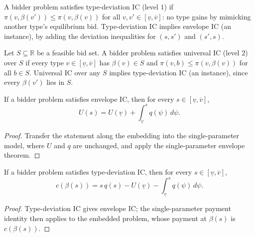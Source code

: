 \begin{definition}\label{def:MathEconLib.BidderProblem.HasTypeDeviationIC}\leanok
{}
A bidder problem satisfies type-deviation IC (level $1$) if $\pi(v,\beta(v'))\le\pi(v,\beta(v))$ for all $v,v'\in[\underline v,\overline v]$: no type gains by mimicking another type's equilibrium bid. Type-deviation IC implies envelope IC (an instance), by adding the deviation inequalities for $(s,s')$ and $(s',s)$.
\end{definition}

\begin{definition}\label{def:MathEconLib.BidderProblem.HasUniversalIC}\leanok
{}
Let $S\subseteq\mathbb{R}$ be a feasible bid set. A bidder problem satisfies universal IC (level $2$) over $S$ if every type $v\in[\underline v,\overline v]$ has $\beta(v)\in S$ and $\pi(v,b)\le\pi(v,\beta(v))$ for all $b\in S$. Universal IC over any $S$ implies type-deviation IC (an instance), since every $\beta(v')$ lies in $S$.
\end{definition}

\begin{theorem}\label{thm:MathEconLib.BidderProblem.integral_rep}\leanok
{}
If a bidder problem satisfies envelope IC, then for every $s\in[\underline v,\overline v]$,
\[
U(s)=U(\underline v)+\int_{\underline v}^{s}q(\psi)\,d\psi.
\]
\end{theorem}
\begin{proof}\leanok
{}
Transfer the statement along the embedding into the single-parameter model, where $U$ and $q$ are unchanged, and apply the single-parameter envelope theorem.
\end{proof}

\begin{theorem}\label{thm:MathEconLib.BidderProblem.payment_identity}\leanok
{}
If a bidder problem satisfies type-deviation IC, then for every $s\in[\underline v,\overline v]$,
\[
c(\beta(s))=s\,q(s)-U(\underline v)-\int_{\underline v}^{s}q(\psi)\,d\psi.
\]
\end{theorem}
\begin{proof}\leanok
{}
Type-deviation IC gives envelope IC; the single-parameter payment identity then applies to the embedded problem, whose payment at $\beta(s)$ is $c(\beta(s))$.
\end{proof}

